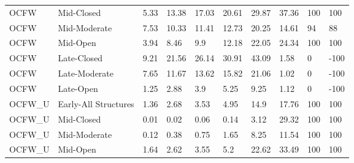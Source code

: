\begin{sidewaystable}[!htbp]
\begin{tabular}{@{}llllllllll@{}}
\small OCFW            & Mid-Closed           & 5.33   & 13.38   & 17.03   & 20.61   & 29.87    & 37.36                                                     & \small 100                                                     & 100             \\
\small OCFW            & Mid-Moderate         & 7.53   & 10.33   & 11.41   & 12.73   & 20.25    & 14.61                                                     & \small 94                                                      & 88              \\
\small OCFW            & Mid-Open             & 3.94   & 8.46    & 9.9     & 12.18   & 22.05    & 24.34                                                     & \small 100                                                     & 100             \\
\small OCFW            & Late-Closed          & 9.21   & 21.56   & 26.14   & 30.91   & 43.09    & 1.58                                                      & \small 0                                                       & -100            \\
\small OCFW            & Late-Moderate        & 7.65   & 11.67   & 13.62   & 15.82   & 21.06    & 1.02                                                      & \small 0                                                       & -100            \\
\small OCFW            & Late-Open            & 1.25   & 2.88    & 3.9     & 5.25    & 9.25     & 1.12                                                      & \small 0                                                       & -100            \\
\small OCFW\_U         & Early-All Structures & 1.36   & 2.68    & 3.53    & 4.95    & 14.9     & 17.76                                                     & \small 100                                                     & 100             \\
\small OCFW\_U         & Mid-Closed           & 0.01   & 0.02    & 0.06    & 0.14    & 3.12     & 29.32                                                     & \small 100                                                     & 100             \\
\small OCFW\_U         & Mid-Moderate         & 0.12   & 0.38    & 0.75    & 1.65    & 8.25     & 11.54                                                     & \small 100                                                     & 100             \\
\small OCFW\_U         & Mid-Open             & 1.64   & 2.62    & 3.55    & 5.2     & 22.62    & 33.49                                                     & \small 100                                                     & 100             \\

\end{tabular}
\end{sidewaystable}
